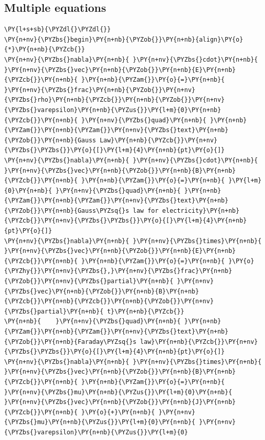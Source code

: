 \documentclass[a4paper,twoside]{article}
\begin{document}
\subsection{Multiple equations}
\begin{tscode}[lang=latex, engine=pygments]
\begin{Verbatim}[commandchars=\\\{\},breaklines, breakanywhere, commandchars=\\\{\}]
\PY{l+s+sb}{\PYZdl{}\PYZdl{}}
\PY{n+nv}{\PYZbs{}begin}\PY{n+nb}{\PYZob{}}\PY{n+nb}{align}\PY{o}{*}\PY{n+nb}{\PYZcb{}}
\PY{n+nv}{\PYZbs{}nabla}\PY{n+nb}{ }\PY{n+nv}{\PYZbs{}cdot}\PY{n+nb}{ }\PY{n+nv}{\PYZbs{}vec}\PY{n+nb}{\PYZob{}}\PY{n+nb}{E}\PY{n+nb}{\PYZcb{}}\PY{n+nb}{ }\PY{n+nb}{\PYZam{}}\PY{o}{=}\PY{n+nb}{ }\PY{n+nv}{\PYZbs{}frac}\PY{n+nb}{\PYZob{}}\PY{n+nv}{\PYZbs{}rho}\PY{n+nb}{\PYZcb{}}\PY{n+nb}{\PYZob{}}\PY{n+nv}{\PYZbs{}varepsilon}\PY{n+nb}{\PYZus{}}\PY{l+m}{0}\PY{n+nb}{\PYZcb{}}\PY{n+nb}{ }\PY{n+nv}{\PYZbs{}quad}\PY{n+nb}{ }\PY{n+nb}{\PYZam{}}\PY{n+nb}{\PYZam{}}\PY{n+nv}{\PYZbs{}text}\PY{n+nb}{\PYZob{}}\PY{n+nb}{Gauss Law}\PY{n+nb}{\PYZcb{}}\PY{n+nv}{\PYZbs{}\PYZbs{}}\PY{o}{[}\PY{l+m}{4}\PY{n+nb}{pt}\PY{o}{]}
\PY{n+nv}{\PYZbs{}nabla}\PY{n+nb}{ }\PY{n+nv}{\PYZbs{}cdot}\PY{n+nb}{ }\PY{n+nv}{\PYZbs{}vec}\PY{n+nb}{\PYZob{}}\PY{n+nb}{B}\PY{n+nb}{\PYZcb{}}\PY{n+nb}{ }\PY{n+nb}{\PYZam{}}\PY{o}{=}\PY{n+nb}{ }\PY{l+m}{0}\PY{n+nb}{ }\PY{n+nv}{\PYZbs{}quad}\PY{n+nb}{ }\PY{n+nb}{\PYZam{}}\PY{n+nb}{\PYZam{}}\PY{n+nv}{\PYZbs{}text}\PY{n+nb}{\PYZob{}}\PY{n+nb}{Gauss\PYZsq{}s law for electricity}\PY{n+nb}{\PYZcb{}}\PY{n+nv}{\PYZbs{}\PYZbs{}}\PY{o}{[}\PY{l+m}{4}\PY{n+nb}{pt}\PY{o}{]}
\PY{n+nv}{\PYZbs{}nabla}\PY{n+nb}{ }\PY{n+nv}{\PYZbs{}times}\PY{n+nb}{ }\PY{n+nv}{\PYZbs{}vec}\PY{n+nb}{\PYZob{}}\PY{n+nb}{E}\PY{n+nb}{\PYZcb{}}\PY{n+nb}{ }\PY{n+nb}{\PYZam{}}\PY{o}{=}\PY{n+nb}{ }\PY{o}{\PYZhy{}}\PY{n+nv}{\PYZbs{},}\PY{n+nv}{\PYZbs{}frac}\PY{n+nb}{\PYZob{}}\PY{n+nv}{\PYZbs{}partial}\PY{n+nb}{ }\PY{n+nv}{\PYZbs{}vec}\PY{n+nb}{\PYZob{}}\PY{n+nb}{B}\PY{n+nb}{\PYZcb{}}\PY{n+nb}{\PYZcb{}}\PY{n+nb}{\PYZob{}}\PY{n+nv}{\PYZbs{}partial}\PY{n+nb}{ t}\PY{n+nb}{\PYZcb{}}
\PY{n+nb}{    }\PY{n+nv}{\PYZbs{}quad}\PY{n+nb}{ }\PY{n+nb}{\PYZam{}}\PY{n+nb}{\PYZam{}}\PY{n+nv}{\PYZbs{}text}\PY{n+nb}{\PYZob{}}\PY{n+nb}{Faraday\PYZsq{}s law}\PY{n+nb}{\PYZcb{}}\PY{n+nv}{\PYZbs{}\PYZbs{}}\PY{o}{[}\PY{l+m}{4}\PY{n+nb}{pt}\PY{o}{]}
\PY{n+nv}{\PYZbs{}nabla}\PY{n+nb}{ }\PY{n+nv}{\PYZbs{}times}\PY{n+nb}{ }\PY{n+nv}{\PYZbs{}vec}\PY{n+nb}{\PYZob{}}\PY{n+nb}{B}\PY{n+nb}{\PYZcb{}}\PY{n+nb}{ }\PY{n+nb}{\PYZam{}}\PY{o}{=}\PY{n+nb}{ }\PY{n+nv}{\PYZbs{}mu}\PY{n+nb}{\PYZus{}}\PY{l+m}{0}\PY{n+nb}{ }\PY{n+nv}{\PYZbs{}vec}\PY{n+nb}{\PYZob{}}\PY{n+nb}{J}\PY{n+nb}{\PYZcb{}}\PY{n+nb}{ }\PY{o}{+}\PY{n+nb}{ }\PY{n+nv}{\PYZbs{}mu}\PY{n+nb}{\PYZus{}}\PY{l+m}{0}\PY{n+nb}{ }\PY{n+nv}{\PYZbs{}varepsilon}\PY{n+nb}{\PYZus{}}\PY{l+m}{0}

\end{Verbatim}
\end{tscode}
\end{document}
